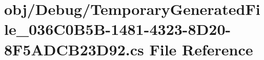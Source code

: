 \hypertarget{_debug_2_temporary_generated_file__036_c0_b5_b-1481-4323-8_d20-8_f5_a_d_c_b23_d92_8cs}{
\section{obj/Debug/TemporaryGeneratedFile\_\-036C0B5B-\/1481-\/4323-\/8D20-\/8F5ADCB23D92.cs File Reference}
\label{_debug_2_temporary_generated_file__036_c0_b5_b-1481-4323-8_d20-8_f5_a_d_c_b23_d92_8cs}
}
